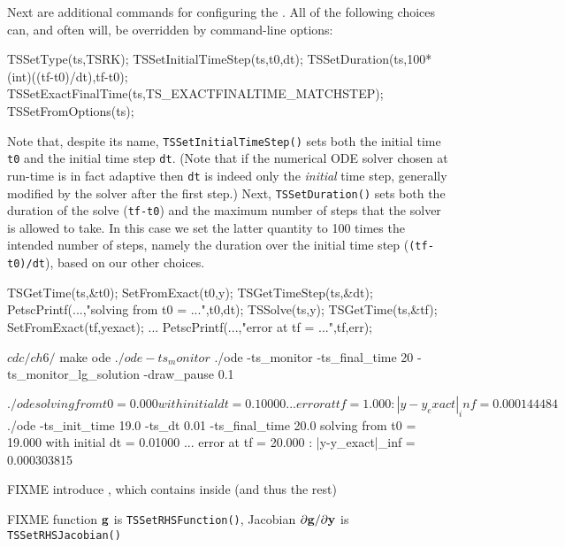 Next are additional commands for configuring the \pTS.  All of the following choices can, and often will, be overridden by command-line options:
\begin{code}
  TSSetType(ts,TSRK);
  TSSetInitialTimeStep(ts,t0,dt);
  TSSetDuration(ts,100*(int)((tf-t0)/dt),tf-t0);
  TSSetExactFinalTime(ts,TS_EXACTFINALTIME_MATCHSTEP);
  TSSetFromOptions(ts);
\end{code}
Note that, despite its name, \texttt{TSSetInitialTimeStep()} sets both the initial time \texttt{t0} and the initial time step \texttt{dt}.  (Note that if the numerical ODE solver chosen at run-time is in fact adaptive then \texttt{dt} is indeed only the \emph{initial} time step, generally modified by the solver after the first step.)  Next, \texttt{TSSetDuration()} sets both the duration of the solve (\texttt{tf-t0}) and the maximum number of steps that the solver is allowed to take.  In this case we set the latter quantity to 100 times the intended number of steps, namely the duration over the initial time step (\texttt{(tf-t0)/dt}), based on our other choices.


\begin{code}
  TSGetTime(ts,&t0);
  SetFromExact(t0,y);
  TSGetTimeStep(ts,&dt);
  PetscPrintf(...,"solving from t0 = ...",t0,dt);
  TSSolve(ts,y);
  TSGetTime(ts,&tf);
  SetFromExact(tf,yexact);
  ...
  PetscPrintf(...,"error at tf = ...",tf,err);
\end{code}


\begin{cline}
$ cd c/ch6/
$ make ode
$ ./ode -ts_monitor
$ ./ode -ts_monitor -ts_final_time 20 -ts_monitor_lg_solution -draw_pause 0.1
\end{cline}

\begin{cline}
$ ./ode 
solving from t0 = 0.000 with initial dt = 0.10000 ...
error at tf = 1.000 :  |y-y_exact|_inf = 0.000144484
$ ./ode -ts_init_time 19.0 -ts_dt 0.01 -ts_final_time 20.0
solving from t0 = 19.000 with initial dt = 0.01000 ...
error at tf = 20.000 :  |y-y_exact|_inf = 0.000303815
\end{cline}

FIXME introduce \pTS, which contains \pSNES inside (and thus the rest)

FIXME function $\mathbf{g}$ is \texttt{TSSetRHSFunction()}, Jacobian $\partial \mathbf{g}/\partial \mathbf{y}$ is \texttt{TSSetRHSJacobian()}

